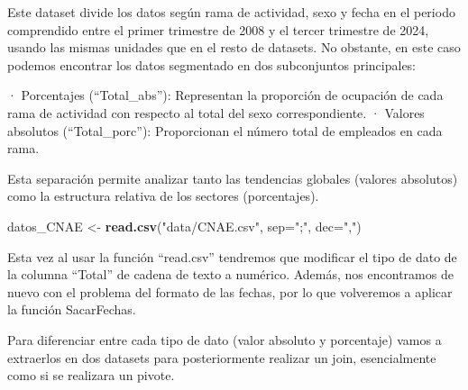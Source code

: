 \documentclass[notspecified,article,submit,moreauthors,pdftex]{Definitions/mdpi}
\newenvironment{Shaded}{\begin{snugshade}}{\end{snugshade}}
\newcommand{\AttributeTok}[1]{\textcolor[rgb]{0.13,0.29,0.53}{#1}}
\newcommand{\FunctionTok}[1]{\textcolor[rgb]{0.13,0.29,0.53}{\textbf{#1}}}
\newcommand{\NormalTok}[1]{#1}
\newcommand{\OtherTok}[1]{\textcolor[rgb]{0.56,0.35,0.01}{#1}}
\newcommand{\SpecialCharTok}[1]{\textcolor[rgb]{0.81,0.36,0.00}{\textbf{#1}}}
\newcommand{\StringTok}[1]{\textcolor[rgb]{0.31,0.60,0.02}{#1}}
\begin{document}
Este dataset divide los datos según rama de actividad, sexo y fecha en
el periodo comprendido entre el primer trimestre de 2008 y el tercer
trimestre de 2024, usando las mismas unidades que en el resto de
datasets. No obstante, en este caso podemos encontrar los datos
segmentado en dos subconjuntos principales:

· Porcentajes (``Total\_abs''): Representan la proporción de ocupación
de cada rama de actividad con respecto al total del sexo
correspondiente. · Valores absolutos (``Total\_porc''): Proporcionan el
número total de empleados en cada rama.

Esta separación permite analizar tanto las tendencias globales (valores
absolutos) como la estructura relativa de los sectores (porcentajes).

\begin{Shaded}
\begin{Highlighting}[]
\NormalTok{datos\_CNAE }\OtherTok{\textless{}{-}} \FunctionTok{read.csv}\NormalTok{(}\StringTok{"data/CNAE.csv"}\NormalTok{, }\AttributeTok{sep=}\StringTok{";"}\NormalTok{, }\AttributeTok{dec=}\StringTok{","}\NormalTok{)}
\end{Highlighting}
\end{Shaded}

Esta vez al usar la función ``read.csv'' tendremos que modificar el tipo
de dato de la columna ``Total'' de cadena de texto a numérico. Además,
nos encontramos de nuevo con el problema del formato de las fechas, por
lo que volveremos a aplicar la función SacarFechas.

\begin{Shaded}
\end{Shaded}

Para diferenciar entre cada tipo de dato (valor absoluto y porcentaje)
vamos a extraerlos en dos datasets para posteriormente realizar un join,
esencialmente como si se realizara un pivote.
\end{document}
